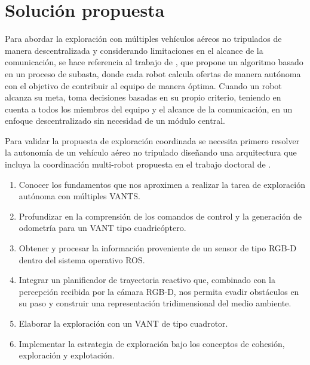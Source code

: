 \newpage

\section{Solución propuesta}

Para abordar la exploración con múltiples vehículos aéreos no tripulados de manera descentralizada y considerando limitaciones en el alcance de la comunicación, se hace referencia al trabajo de \citeauthor{CINVESTAM2013}\cite{CINVESTAM2013}, que propone un algoritmo basado en un proceso de subasta, donde cada robot calcula ofertas de manera autónoma con el objetivo de contribuir al equipo de manera óptima. Cuando un robot alcanza su meta, toma decisiones basadas en su propio criterio, teniendo en cuenta a todos los miembros del equipo y el alcance de la comunicación, en un enfoque descentralizado sin necesidad de un módulo central.

Para validar la propuesta de exploración coordinada se necesita primero resolver la autonomía de un vehículo aéreo no tripulado diseñando una arquitectura que incluya la coordinación multi-robot propuesta en el trabajo doctoral de \citeauthor{CINVESTAM2013}\cite{CINVESTAM2013}.

\begin{enumerate}\setlength{\itemsep}{-1mm}
\item Conocer los fundamentos que nos aproximen a realizar la tarea de exploración autónoma con múltiples VANTS.
\item Profundizar en la comprensión de los comandos de control y la generación de odometría para un VANT tipo cuadricóptero.
\item Obtener y procesar la información proveniente de un sensor de tipo RGB-D dentro del sistema operativo ROS.
\item Integrar un planificador de trayectoria reactivo que, combinado con la percepción recibida por la cámara RGB-D, nos permita evadir obstáculos en su paso y construir una representación tridimensional del medio ambiente.
\item Elaborar la exploración con un VANT de tipo cuadrotor.
\item Implementar la estrategia de exploración bajo los conceptos de cohesión, exploración y explotación.
\end{enumerate}




